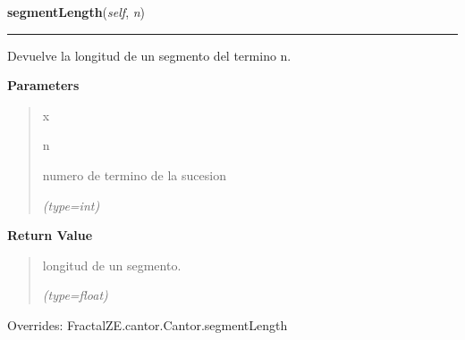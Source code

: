 \hspace{.8\funcindent}\begin{boxedminipage}{\funcwidth}

    \raggedright \textbf{segmentLength}(\textit{self}, \textit{n})

    \vspace{-1.5ex}

    \rule{\textwidth}{0.5\fboxrule}
\setlength{\parskip}{2ex}
    Devuelve la longitud de un segmento del termino n.

\setlength{\parskip}{1ex}
      \textbf{Parameters}
      \vspace{-1ex}

      \begin{quote}
        \begin{Ventry}{x}

          \item[n]

          numero de termino de la sucesion

            {\it (type=int)}

        \end{Ventry}

      \end{quote}

      \textbf{Return Value}
    \vspace{-1ex}

      \begin{quote}
      longitud de un segmento.

      {\it (type=float)}

      \end{quote}

      Overrides: FractalZE.cantor.Cantor.segmentLength

    \end{boxedminipage}

    \vspace{0.5ex}

